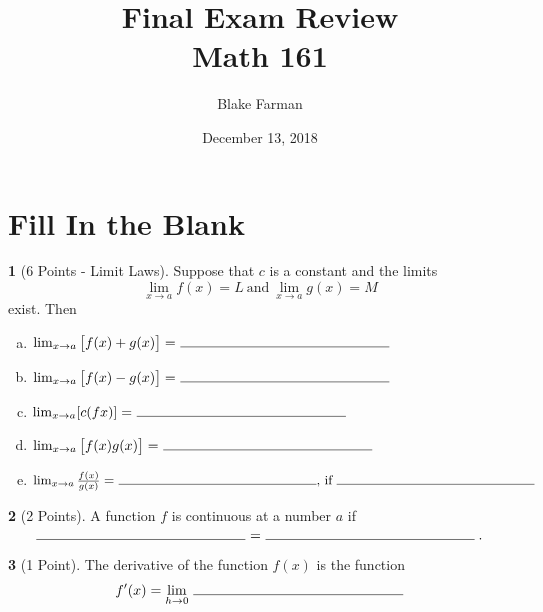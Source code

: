 \documentclass[12pt]{amsart}
\author{Blake Farman}
\title[Review]{Final Exam Review\\Math 161}
\date{December 13, 2018}
\begin{document}
\maketitle

\theoremstyle{definition}
\newtheorem{thm}{}
\renewcommand{\qedsymbol}{}

\section*{Fill In the Blank}

\begin{thm}[6 Points - Limit Laws]
  Suppose that \(c\) is a constant and the limits
  \[\lim_{x \to a} f(x) = L\ \text{and}\ \lim_{x \to a} g(x) = M\]
  exist.
  Then
    \begin{enumerate}[(a)]
    \item
      \(\lim_{x \to a} \left[f(x) + g(x)\right] =\ \line(1,0){150}\)
      \vspace{.25in}
    \item
      \(\lim_{x \to a} \left[f(x) - g(x)\right] =\ \line(1,0){150}\)
      \vspace{.25in}
    \item
      \(\lim_{x \to a} [c(fx)] =\ \line(1,0){150}\)
      \vspace{.25in}
    \item
      \(\lim_{x \to a} \left[f(x)g(x)\right] =\ \line(1,0){150}\)
      \vspace{.25in}
    \item
      \(\lim_{x \to a} \frac{f(x)}{g(x)} =\ \line(1,0){150},\, \text{if}\ \line(1,0){150}\)
      \vspace{.25in}
    \end{enumerate}
\end{thm}

\begin{thm}[2 Points]
  A function \(f\) is continuous at a number \(a\) if
  \vspace{.15in}
  \[\line(1,0){150}\ =\ \line(1,0){150}.\]
\end{thm}

\begin{thm}[1 Point]
  The derivative of the function \(f(x)\) is the function
  \vspace{.25in}
  \[f^\prime(x) = \lim_{h \to 0}\ \line(1,0){150}\]
\end{thm}
\end{document}
